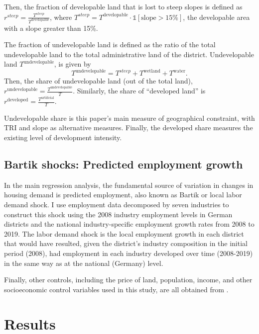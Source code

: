 \documentclass[
  12pt,
]{article}
\begin{document}
Then, the fraction of developable land that is lost to steep slopes is
defined as \(r^{steep} = \frac{T^{steep}}{T^{\text{developable}}}\),
where
\(T^{steep} = T^{\text{developable}} \cdot\mathbb{1}\left[{\text{slope} > 15\%}\right]\),
the developable area with a slope greater than 15\%.

The fraction of undevelopable land is defined as the ratio of the total
undevelopable land to the total administrative land of the district.
Undevelopable land \(T^{\text{undevelopable}}\), is given by \[
T^{\text{undevelopable}} = T^{steep} + T^{\text{wetland}} + T^{\text{water}}.
\] Then, the share of undevelopable land (out of the total land),
\(r^{\text{undevelopable}} = \frac{T^{\text{undevelopable}}}{T}\).
Similarly, the share of ``developed land'' is
\(r^{\text{developed}} = \frac{T^{\text{artificial}}}{T}\).

Undevelopable share is this paper's main measure of geographical
constraint, with TRI and slope as alternative measures. Finally, the
developed share measures the existing level of development intensity.

\subsection{Bartik shocks: Predicted employment
growth}\label{bartik-shocks-predicted-employment-growth}

In the main regression analysis, the fundamental source of variation in
changes in housing demand is predicted employment, also known as Bartik
or local labor demand shock. I use employment data decomposed by seven
industries to construct this shock using the 2008 industry employment
levels in German districts and the national industry-specific employment
growth rates from 2008 to 2019. The labor demand shock is the local
employment growth in each district that would have resulted, given the
district's industry composition in the initial period (2008), had
employment in each industry developed over time (2008-2019) in the same
way as at the national (Germany) level.

Finally, other controls, including the price of land, population,
income, and other socioeconomic control variables used in this study,
are all obtained from \citet{atlasde_2022}.

\section{Results}\label{results}
\end{document}
